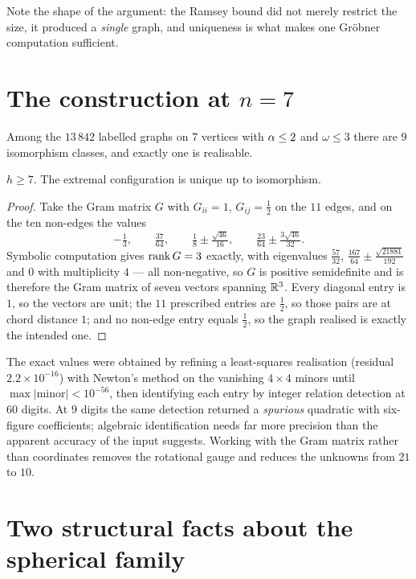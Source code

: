 Note the shape of the argument: the Ramsey bound did not merely restrict the
size, it produced a \emph{single} graph, and uniqueness is what makes one
Gr\"obner computation sufficient.

\section{The construction at $n=7$}

Among the $13\,842$ labelled graphs on $7$ vertices with $\alpha\le2$ and
$\omega\le3$ there are $9$ isomorphism classes, and exactly one is realisable.

\begin{theorem}
$h\ge7$. The extremal configuration is unique up to isomorphism.
\end{theorem}

\begin{proof}
Take the Gram matrix $G$ with $G_{ii}=1$, $G_{ij}=\tfrac12$ on the $11$ edges,
and on the ten non-edges the values
\[
-\tfrac13,\qquad \tfrac{37}{64},\qquad
\tfrac18\pm\tfrac{\sqrt{46}}{16},\qquad
\tfrac{23}{64}\pm\tfrac{3\sqrt{46}}{32}.
\]
Symbolic computation gives $\operatorname{rank} G=3$ exactly, with eigenvalues
$\tfrac{57}{32}$, $\tfrac{167}{64}\pm\tfrac{\sqrt{21881}}{192}$ and $0$ with
multiplicity $4$ --- all non-negative, so $G$ is positive semidefinite and is
therefore the Gram matrix of seven vectors spanning $\mathbb{R}^3$. Every diagonal entry
is $1$, so the vectors are unit; the $11$ prescribed entries are $\tfrac12$, so
those pairs are at chord distance $1$; and no non-edge entry equals $\tfrac12$,
so the graph realised is exactly the intended one.
\end{proof}

\begin{remark}[on method]
The exact values were obtained by refining a least-squares realisation (residual
$2.2\times10^{-16}$) with Newton's method on the vanishing $4\times4$ minors
until $\max|\text{minor}|<10^{-56}$, then identifying each entry by integer
relation detection at $60$ digits. At $9$ digits the same detection returned a
\emph{spurious} quadratic with six-figure coefficients; algebraic identification
needs far more precision than the apparent accuracy of the input suggests.
Working with the Gram matrix rather than coordinates removes the rotational
gauge and reduces the unknowns from $21$ to $10$.
\end{remark}

\section{Two structural facts about the spherical family}

